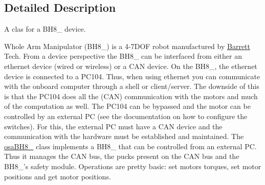 \subsection{Detailed Description}
A clas for a B\-H8\-\_ device. 

Whole Arm Manipulator (B\-H8\-\_) is a 4-\/7\-D\-O\-F robot manufactured by \hyperlink{struct_barrett}{Barrett} Tech. From a device perspective the B\-H8\-\_ can be interfaced from either an ethernet device (wired or wireless) or a C\-A\-N device. On the B\-H8\-\_, the ethernet device is connected to a P\-C104. Thus, when using ethernet you can communicate with the onboard computer through a shell or client/server. The downside of this is that the P\-C104 does all the (C\-A\-N) communication with the motors and much of the computation as well. The P\-C104 can be bypassed and the motor can be controlled by an external P\-C (see the documentation on how to configure the switches). For this, the external P\-C must have a C\-A\-N device and the communication with the hardware must be established and maintained. The \hyperlink{classosa_b_h8__280}{osa\-B\-H8\-\_} class implements a B\-H8\-\_ that can be controlled from an external P\-C. Thus it manages the C\-A\-N bus, the pucks present on the C\-A\-N bus and the B\-H8\-\_'s safety module. Operations are pretty basic\-: set motors torques, set motor positions and get motor positions. 


